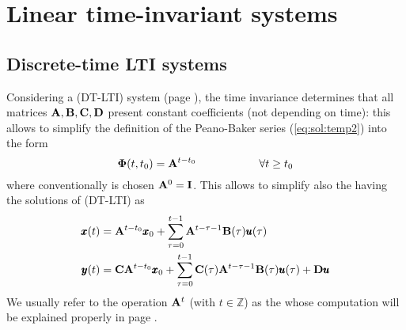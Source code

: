 \section{Linear time-invariant systems}
\subsection*{Discrete-time LTI systems}
	Considering a (DT-LTI) system (page \pageref{DTLTI}), the time invariance determines that all matrices $\mathbf{A},\mathbf{B},\mathbf{C},\mathbf{D}$ present constant coefficients (not depending on time): this allows to simplify the definition of the Peano-Baker series (\ref{eq:sol:temp2}) into the form
	\begin{equation} \label{eq:sol:adtsol}
		\mathbf{\Phi}(t,t_0) = \mathbf{A}^{t-t_0} \hspace{2cm} \forall t\geq t_0
	\end{equation}
	where conventionally is chosen $\mathbf{A}^0 = \mathbf{I}$. This allows to simplify also the  having the solutions of (DT-LTI) as
	\begin{equation}
		\begin{split}
			\pmb{x}(t) & = \mathbf{A}^{t-t_0} \pmb{x}_0 + \sum_{\tau = 0}^{t-1} \mathbf{A}^{t-\tau - 1} \mathbf{B}(\tau) \pmb{u}(\tau) \\
			\pmb{y}(t) & = \mathbf{C} \mathbf{A}^{t-t_0} \pmb{x}_0 + \sum_{\tau = 0}^{t-1} \mathbf{C}(\tau) \mathbf{A}^{t-\tau - 1} \mathbf{B}(\tau) \pmb{u}(\tau) + \mathbf{D} \pmb{u} 
		\end{split}
	\end{equation}
	We usually refer to the operation $\mathbf{A}^t$ (with $t\in \mathds Z$) as the  whose computation will be explained properly in page \pageref{sec:sol:matrixpower}.

